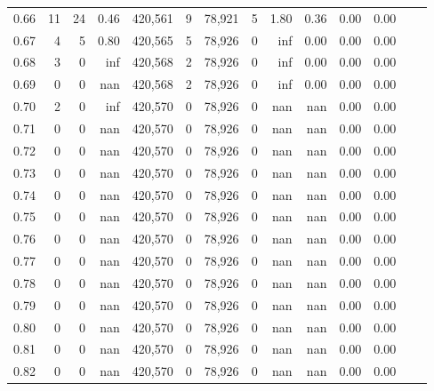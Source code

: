 \begin{tabular}{rrrrrrrrrrrrrr}
0.66 &      11 &     24 &    0.46 &  420,561 &        9 &  78,921 &       5 &  1.80 &  0.36 &  0.00 &      0.00 \\
0.67 &       4 &      5 &    0.80 &  420,565 &        5 &  78,926 &       0 &   inf &  0.00 &  0.00 &      0.00 \\
0.68 &       3 &      0 &     inf &  420,568 &        2 &  78,926 &       0 &   inf &  0.00 &  0.00 &      0.00 \\
0.69 &       0 &      0 &     nan &  420,568 &        2 &  78,926 &       0 &   inf &  0.00 &  0.00 &      0.00 \\
0.70 &       2 &      0 &     inf &  420,570 &        0 &  78,926 &       0 &   nan &   nan &  0.00 &      0.00 \\
0.71 &       0 &      0 &     nan &  420,570 &        0 &  78,926 &       0 &   nan &   nan &  0.00 &      0.00 \\
0.72 &       0 &      0 &     nan &  420,570 &        0 &  78,926 &       0 &   nan &   nan &  0.00 &      0.00 \\
0.73 &       0 &      0 &     nan &  420,570 &        0 &  78,926 &       0 &   nan &   nan &  0.00 &      0.00 \\
0.74 &       0 &      0 &     nan &  420,570 &        0 &  78,926 &       0 &   nan &   nan &  0.00 &      0.00 \\
0.75 &       0 &      0 &     nan &  420,570 &        0 &  78,926 &       0 &   nan &   nan &  0.00 &      0.00 \\
0.76 &       0 &      0 &     nan &  420,570 &        0 &  78,926 &       0 &   nan &   nan &  0.00 &      0.00 \\
0.77 &       0 &      0 &     nan &  420,570 &        0 &  78,926 &       0 &   nan &   nan &  0.00 &      0.00 \\
0.78 &       0 &      0 &     nan &  420,570 &        0 &  78,926 &       0 &   nan &   nan &  0.00 &      0.00 \\
0.79 &       0 &      0 &     nan &  420,570 &        0 &  78,926 &       0 &   nan &   nan &  0.00 &      0.00 \\
0.80 &       0 &      0 &     nan &  420,570 &        0 &  78,926 &       0 &   nan &   nan &  0.00 &      0.00 \\
0.81 &       0 &      0 &     nan &  420,570 &        0 &  78,926 &       0 &   nan &   nan &  0.00 &      0.00 \\
0.82 &       0 &      0 &     nan &  420,570 &        0 &  78,926 &       0 &   nan &   nan &  0.00 &      0.00 \\

\end{tabular}
